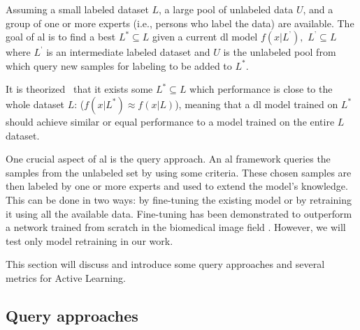     Assuming a small labeled dataset $L$, a large pool of unlabeled data $U$, and a group of one or more experts (i.e., persons who label the data) are available. The goal of \acrshort{al} is to find a best $L^*\subseteq L$ given a current \acrshort{dl} model $f(x|L^{\text{'}}),$ $L^{\text{'}}\subseteq L$ where $L^{\text{'}}$ is an intermediate labeled dataset and $U$ is the unlabeled pool from which query new samples for labeling to be added to $L^*$.
    
    It is theorized~\cite{budd2021survey} that it exists some $L^*\subseteq L$ which performance is close to the whole dataset $L$: ($f(x|L^*)\approx f(x|L)$), meaning that a \acrshort{dl} model trained on $L^*$ should achieve similar or equal performance to a model trained on the entire $L$ dataset.
    
    
    
    One crucial aspect of \acrshort{al} is the query approach. An \acrshort{al} framework queries the samples from the unlabeled set by using some criteria. These chosen samples are then labeled by one or more experts and used to extend the model's knowledge. This can be done in two ways: by fine-tuning the existing model or by retraining it using all the available data.
    Fine-tuning has been demonstrated to outperform a network trained from scratch in the biomedical image field \cite{tajbakhsh2016convolutional}. However, we will test only model retraining in our work.
    
    This section will discuss and introduce some query approaches and several metrics for Active Learning.

    
\subsection{Query approaches}
    
